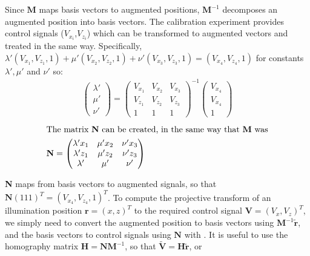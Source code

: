 Since $\textbf{M}$ maps basis vectors to augmented positions, $\textbf{M}^{-1}$ decomposes an augmented position into basis vectors.
The calibration experiment provides control signals ($V_{x_i}$,$V_{z_i}$) which can be transformed to augmented vectors and treated in the same way.
Specifically, ${\lambda'(V_{x_1},V_{z_1},1) + \mu'(V_{x_2},V_{z_2},1)+ \nu'(V_{x_3},V_{z_3},1) = (V_{x_4},V_{z_4},1)}$ for constants $ \lambda' , \mu' $ and $ \nu' $ so:
\begin{align}
  \begin{pmatrix}
      \lambda'  \\
      \mu' \\
      \nu'
  \end{pmatrix}
  =
  \begin{pmatrix}
  V_{x_1}& V_{x_2} & V_{x_3} \\
  V_{z_1} & V_{z_2} & V_{z_3} \\
  1 & 1 & 1
  \end{pmatrix}^{-1}
  \begin{pmatrix}
  V_{x_4}  \\
  V_{x_4} \\
  1
  \end{pmatrix}
\end{align}
\begin{align}
  \intertext{The matrix $\textbf{N}$ can be created, in the same way that $\textbf{M}$ was}
\textbf{N} =
    \begin{pmatrix}
    \lambda' x_1 & \mu' x_2 & \nu' x_3 \\
    \lambda' z_1 & \mu' z_2 & \nu' z_3 \\
    \lambda' & \mu' & \nu'
    \end{pmatrix}
\end{align}

\textbf{N} maps from basis vectors to augmented signals, so that $\textbf{N}(111)^T=\left( V_{x_4},V_{z_4}, 1 \right)^T$.
To compute the projective transform of an illumination position $\textbf{r}=(x,z)^T$ to the required control signal $\textbf{V} = (V_x,V_z)^T$, we simply need to convert the augmented position to basis vectors using ${\textbf{M}}^{-1}\widetilde{\textbf{r}}$, and the basis vectors to control signals using $\textbf{N}$ with .
It is useful to use the \gls{homography} matrix $\textbf{H} = \textbf{N}\textbf{M}^{-1}$, so that $\widetilde{\textbf{V}} = \textbf{H} \widetilde{\textbf{r}}$, or

